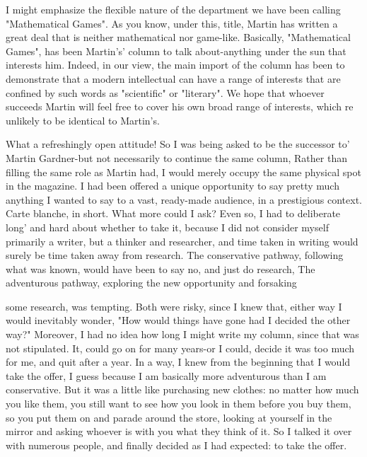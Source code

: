   I might emphasize the flexible nature of the department we have been calling
  "Mathematical Games". As you know, under this, title, Martin has written a
  great deal that is neither mathematical nor game-like. Basically, "Mathematical
  Games", has been Martin's' column to talk about-anything under the sun that
  interests him. Indeed, in our view, the main import of the column has been to
  demonstrate that a modern intellectual can have a range of interests that are
  confined by such words as "scientific" or "literary". We hope that whoever
  succeeds Martin will feel free to cover his own broad range of interests, which
  re unlikely to be identical to Martin's.

What a refreshingly open attitude! So I was being asked to be the successor to' Martin
Gardner-but not necessarily to continue the same column, Rather than filling the same
role as Martin had, I would merely occupy the same physical spot in the magazine.
I had been offered a unique opportunity to say pretty much anything I wanted to say
to a vast, ready-made audience, in a prestigious context. Carte blanche, in short. What
more could I ask? Even so, I had to deliberate long' and hard about whether to take it,
because I did not consider myself primarily a writer, but a thinker and researcher, and
time taken in writing would surely be time taken away from research. The
conservative pathway, following what was known, would have been to say no, and
just do research, The adventurous pathway, exploring the new opportunity and
forsaking





some research, was tempting. Both were risky, since I knew that, either way I would
inevitably wonder, "How would things have gone had I decided the other way?"
Moreover, I had no idea how long I might write my column, since that was not
stipulated. It, could go on for many years-or I could, decide it was too much for me,
and quit after a year.
        In a way, I knew from the beginning that I would take the offer, I guess
because I am basically more adventurous than I am conservative. But it was a little
like purchasing new clothes: no matter how much you like them, you still want to see
how you look in them before you buy them, so you put them on and parade around the
store, looking at yourself in the mirror and asking whoever is with you what they
think of it. So I talked it over with numerous people, and finally decided as I had
expected: to take the offer.

